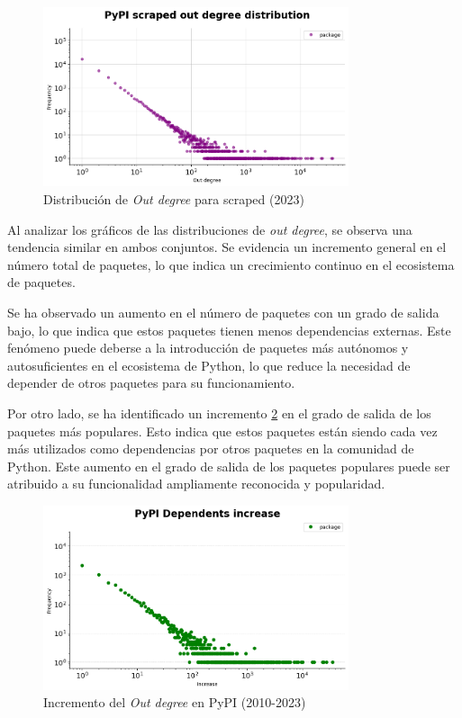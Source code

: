 \begin{figure}[ht!]
    \begin{center}
        \includegraphics[width=0.8\textwidth]{img/pypi/outd_scraped_dist.png}
        \caption{Distribución de \textit{Out degree} para scraped (2023)}
        \label{fig:pypi_scraped_outd_dist}
    \end{center}
\end{figure}

Al analizar los gráficos de las distribuciones de \textit{out degree}, se observa una tendencia similar
en ambos conjuntos. Se evidencia un incremento general en el número total de paquetes, lo que indica un
crecimiento continuo en el ecosistema de paquetes.

Se ha observado un aumento en el número de paquetes con un grado de salida bajo, lo que indica que estos
paquetes tienen menos dependencias externas. Este fenómeno puede deberse a la introducción de paquetes
más autónomos y autosuficientes en el ecosistema de Python, lo que reduce la necesidad de depender de
otros paquetes para su funcionamiento.

Por otro lado, se ha identificado un incremento \ref{fig:dependents_increase} en el grado de salida de los paquetes más populares.
Esto indica que estos paquetes están siendo cada vez más utilizados como dependencias por otros paquetes
en la comunidad de Python. Este aumento en el grado de salida de los paquetes populares puede ser atribuido
a su funcionalidad ampliamente reconocida y popularidad.

\begin{figure}[ht!]
    \begin{center}
        \includegraphics[width=0.8\textwidth]{img/pypi/dependents_increase.png}
        \caption{Incremento del \textit{Out degree} en PyPI (2010-2023)}
        \label{fig:dependents_increase}
    \end{center}
\end{figure}


